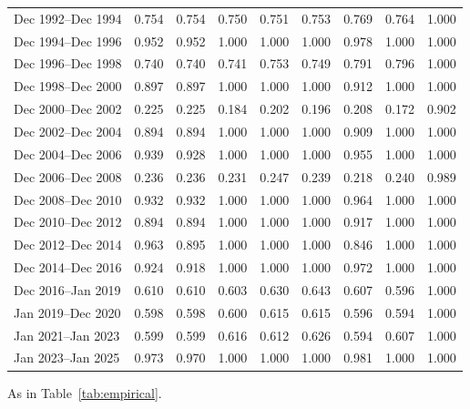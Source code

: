 \begin{table}[p]
\begin{tabular}{lrrrrrrrr}
Dec 1992--Dec 1994 & 0.754 & 0.754 & 0.750 & 0.751 & 0.753 & 0.769 & 0.764 & 1.000 \\
Dec 1994--Dec 1996 & 0.952 & 0.952 & 1.000 & 1.000 & 1.000 & 0.978 & 1.000 & 1.000 \\
Dec 1996--Dec 1998 & 0.740 & 0.740 & 0.741 & 0.753 & 0.749 & 0.791 & 0.796 & 1.000 \\
Dec 1998--Dec 2000 & 0.897 & 0.897 & 1.000 & 1.000 & 1.000 & 0.912 & 1.000 & 1.000 \\
Dec 2000--Dec 2002 & 0.225 & 0.225 & 0.184 & 0.202 & 0.196 & 0.208 & 0.172 & 0.902 \\
Dec 2002--Dec 2004 & 0.894 & 0.894 & 1.000 & 1.000 & 1.000 & 0.909 & 1.000 & 1.000 \\
Dec 2004--Dec 2006 & 0.939 & 0.928 & 1.000 & 1.000 & 1.000 & 0.955 & 1.000 & 1.000 \\
Dec 2006--Dec 2008 & 0.236 & 0.236 & 0.231 & 0.247 & 0.239 & 0.218 & 0.240 & 0.989 \\
Dec 2008--Dec 2010 & 0.932 & 0.932 & 1.000 & 1.000 & 1.000 & 0.964 & 1.000 & 1.000 \\
Dec 2010--Dec 2012 & 0.894 & 0.894 & 1.000 & 1.000 & 1.000 & 0.917 & 1.000 & 1.000 \\
Dec 2012--Dec 2014 & 0.963 & 0.895 & 1.000 & 1.000 & 1.000 & 0.846 & 1.000 & 1.000 \\
Dec 2014--Dec 2016 & 0.924 & 0.918 & 1.000 & 1.000 & 1.000 & 0.972 & 1.000 & 1.000 \\
Dec 2016--Jan 2019 & 0.610 & 0.610 & 0.603 & 0.630 & 0.643 & 0.607 & 0.596 & 1.000 \\
Jan 2019--Dec 2020 & 0.598 & 0.598 & 0.600 & 0.615 & 0.615 & 0.596 & 0.594 & 1.000 \\
Jan 2021--Jan 2023 & 0.599 & 0.599 & 0.616 & 0.612 & 0.626 & 0.594 & 0.607 & 1.000 \\
Jan 2023--Jan 2025 & 0.973 & 0.970 & 1.000 & 1.000 & 1.000 & 0.981 & 1.000 & 1.000 \\
\bottomrule
\end{tabular}
\par\smallskip\begin{minipage}{0.97\linewidth}\footnotesize As in Table~\ref{tab:empirical}.\end{minipage}
\end{table}

